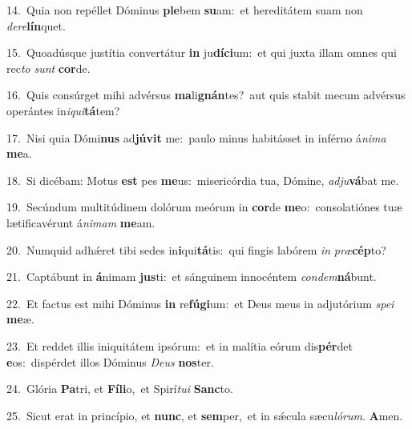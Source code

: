 {\numbfont\textcolor{\numbcolor}{14.}}~Quia non repéllet Dóminus \textbf{ple}\-bem \textbf{su}\-am:~\star et hereditátem suam non \textit{de}\-\textit{re}\textbf{lín}quet.\par
{\numbfont\textcolor{\numbcolor}{15.}}~Quoadúsque justítia convertátur \textbf{in} ju\-\textbf{dí}\-\textbf{ci}um:~\star et qui juxta illam omnes qui rec\textit{to} \textit{sunt} \textbf{cor}\-de.\par
{\numbfont\textcolor{\numbcolor}{16.}}~Quis consúrget mihi advérsus \textbf{ma}\-li\-\textbf{gnán}\-tes?~\star aut quis stabit mecum advérsus operántes in\-\textit{i}\-\textit{qui}\textbf{tá}tem?\par
{\numbfont\textcolor{\numbcolor}{17.}}~Nisi quia Dómi\textbf{nus} ad\-\textbf{jú}\-\textbf{vit} me:~\star paulo minus habitásset in inférno á\-\textit{ni}\-\textit{ma} \textbf{me}\-a.\par
{\numbfont\textcolor{\numbcolor}{18.}}~Si dicébam: Motus \textbf{est} pes \textbf{me}\-us:~\star misericórdia tua, Dómine, \textit{ad}\-\textit{ju}\textbf{vá}bat me.\par
{\numbfont\textcolor{\numbcolor}{19.}}~Secúndum multitúdinem dolórum meórum in \textbf{cor}\-de \textbf{me}\-o:~\star consolatiónes tuæ lætificavérunt á\-\textit{ni}\-\textit{mam} \textbf{me}\-am.\par
{\numbfont\textcolor{\numbcolor}{20.}}~Numquid adhǽret tibi sedes in\-\textbf{i}\-qui\-\textbf{tá}\-tis:~\star qui fingis labórem \textit{in} \textit{præ}\-\textbf{cép}to?\par
{\numbfont\textcolor{\numbcolor}{21.}}~Captábunt in \textbf{á}\-nimam \textbf{jus}\-ti:~\star et sánguinem innocéntem \textit{con}\-\textit{dem}\textbf{ná}bunt.\par
{\numbfont\textcolor{\numbcolor}{22.}}~Et factus est mihi Dóminus \textbf{in} re\-\textbf{fú}\-\textbf{gi}um:~\star et Deus meus in adjutórium \textit{spe}\-\textit{i} \textbf{me}\-æ.\par
{\numbfont\textcolor{\numbcolor}{23.}}~Et reddet illis iniquitátem ipsórum:~\dagger et in malítia eórum dis\-\textbf{pér}\-det \textbf{e}\-os:~\star dispérdet illos Dóminus \textit{De}\-\textit{us} \textbf{nos}\-ter.\par
{\numbfont\textcolor{\numbcolor}{24.}}~Glória \textbf{Pa}\-tri, et \textbf{Fí}\-\textbf{li}o,~\star et Spirí\-\textit{tu}\-\textit{i} \textbf{Sanc}\-to.\par
{\numbfont\textcolor{\numbcolor}{25.}}~Sicut erat in princípio, et \textbf{nunc}\-, et \textbf{sem}\-per,~\star et in sǽcula sæcu\-\textit{ló}\-\textit{rum}. \textbf{A}\-men.\par
